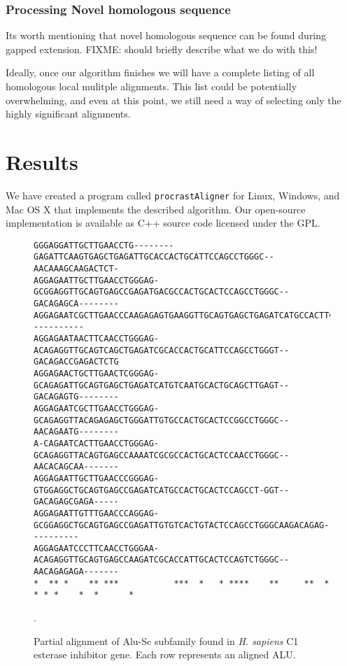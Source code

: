 \documentclass{llncs}
\begin{document}
\subsubsection{Processing Novel homologous sequence}
Its worth mentioning that novel homologous sequence can be found during gapped extension.
FIXME: should briefly describe what we do with this!


Ideally, once our algorithm finishes we will have a complete listing of all homologous local mulitple alignments. This list could be potentially overwhelming, and even at this point, we still need a way of selecting only the highly significant alignments.


\section{Results}
We have created a program called \texttt{procrastAligner} for Linux,
Windows, and Mac OS X that implements the described algorithm. Our
open-source implementation is available as C++ source code licensed
under the GPL.

\begin{figure}[t]
\scriptsize
\begin{verbatim}
GGGAGGATTGCTTGAACCTG--------GAGATTCAAGTGAGCTGAGATTGCACCACTGCATTCCAGCCTGGGC--AACAAAGCAAGACTCT-
AGGAGAATTGCTTGAACCTGGGAG-GCGGAGGTTGCAGTGAGCCGAGATGACGCCACTGCACTCCAGCCTGGGC--GACAGAGCA--------
AGGAGAATCGCTTGAACCCAAGAGAGTGAAGGTTGCAGTGAGCTGAGATCATGCCACTTCACTCCAGCCTGAGTGAAACAGC-----------
AGGAGAATAACTTCAACCTGGGAG-ACAGAGGTTGCAGTCAGCTGAGATCGCACCACTGCATTCCAGCCTGGGT--GACAGACCGAGACTCTG
AGGAGAACTGCTTGAACTCGGGAG-GCAGAGATTGCAGTGAGCTGAGATCATGTCAATGCACTGCAGCTTGAGT--GACAGAGTG--------
AGGAGAATCGCTTGAACCTGGGAG-GCAGAGGTTACAGAGAGCTGGGATTGTGCCACTGCACTCCGGCCTGGGC--AACAGAATG--------
A-CAGAATCACTTGAACCTGGGAG-GCAGAGGTTACAGTGAGCCAAAATCGCGCCACTGCACTCCAACCTGGGC--AACACAGCAA-------
AGGAGAATTGCTTGAACCCGGGAG-GTGGAGGCTGCAGTGAGCCGAGATCATGCCACTGCACTCCAGCCT-GGT--GACAGAGCGAGA-----
AGGAGAATTGTTTGAACCCAGGAG-GCGGAGGCTGCAGTGAGCCGAGATTGTGTCACTGTACTCCAGCCTGGGCAAGACAGAG----------
AGGAGAATCCCTTCAACCTGGGAA-ACAGAGGTTGCAGTGAGCCAAGATCGCACCATTGCACTCCAGTCTGGGC--AACAGAGAGA-------
*  ** *    ** ***           ***  *   * ****    **     **  * * * *    *  *      *

\end{verbatim}
\vspace{-0.5cm}
\normalsize
\caption{Partial alignment of Alu-Sc subfamily found in \emph{H. sapiens} C1 esterase inhibitor gene. Each row represents an aligned ALU.}.
\end{figure}
\end{document}
